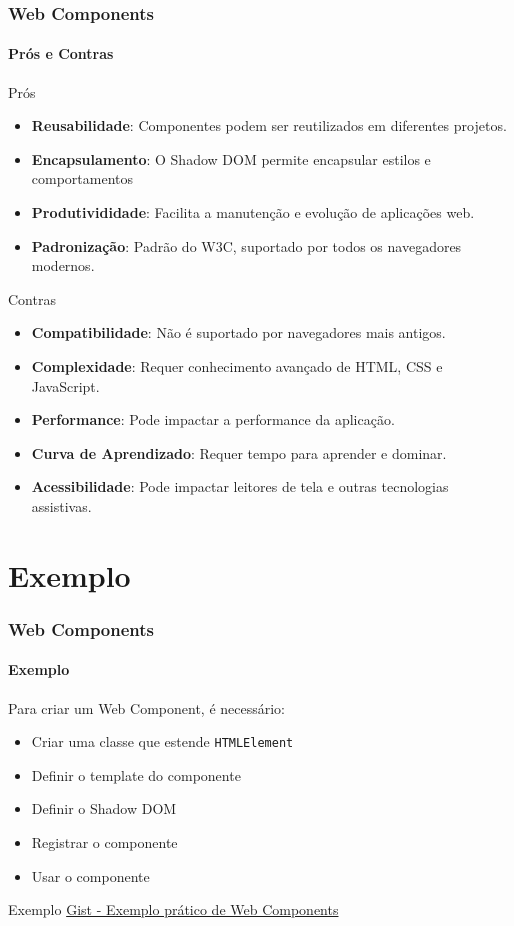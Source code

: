 \documentclass[
	9pt, %
	t, %
]{beamer}
\newcommand{\iconLink}[2]{\href{#1}{\faLink \hspace{0.2em} {#2}}}
\begin{document}
\begin{frame}
	\frametitle{Web Components}
	\framesubtitle{Prós e Contras}
	\begin{exampleblock}{Prós}
		\begin{itemize}
			\item \textbf{Reusabilidade}: Componentes podem ser reutilizados em diferentes projetos.
			\item \textbf{Encapsulamento}: O Shadow DOM permite encapsular estilos e comportamentos
			\item \textbf{Produtivididade}: Facilita a manutenção e evolução de aplicações web.
			\item \textbf{Padronização}: Padrão do W3C, suportado por todos os navegadores modernos.
		\end{itemize}
	\end{exampleblock}

	\begin{alertblock}{Contras}
		\begin{itemize}
			\item \textbf{Compatibilidade}: Não é suportado por navegadores mais antigos.
			\item \textbf{Complexidade}: Requer conhecimento avançado de HTML, CSS e JavaScript.
			\item \textbf{Performance}: Pode impactar a performance da aplicação.
			\item \textbf{Curva de Aprendizado}: Requer tempo para aprender e dominar.
			\item \textbf{Acessibilidade}: Pode impactar leitores de tela e outras tecnologias assistivas.
		\end{itemize}
	\end{alertblock}

\end{frame}

\section{Exemplo}

\begin{frame}
	\frametitle{Web Components}
	\framesubtitle{Exemplo}

	Para criar um Web Component, é necessário:
	\begin{itemize}
		\item Criar uma classe que estende \texttt{HTMLElement}
		\item Definir o template do componente
		\item Definir o Shadow DOM
		\item Registrar o componente
		\item Usar o componente
	\end{itemize}
	
	\begin{exampleblock}{Exemplo}
		\centering
		\iconLink{https://gist.github.com/fabricioifc/36e978f4ff2add25ca0eed6e86219918}{Gist - Exemplo prático de Web Components}
	\end{exampleblock}	

\end{frame}
\end{document}
